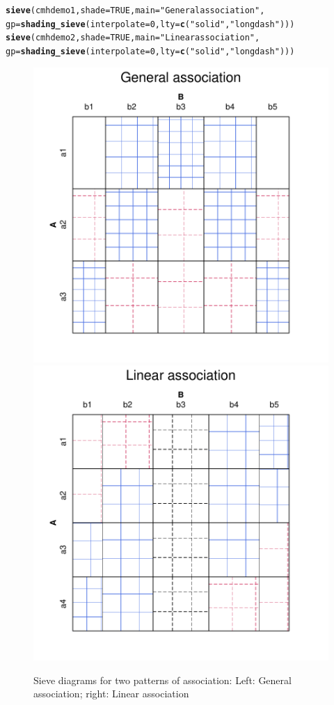 \documentclass[11pt]{book}\usepackage[]{graphicx}\usepackage[]{color}
\makeatletter
\newcommand{\hlnum}[1]{\textcolor[rgb]{0.686,0.059,0.569}{#1}}%
\newcommand{\hlstr}[1]{\textcolor[rgb]{0.192,0.494,0.8}{#1}}%
\newcommand{\hlstd}[1]{\textcolor[rgb]{0.345,0.345,0.345}{#1}}%
\newcommand{\hlkwc}[1]{\textcolor[rgb]{0.333,0.667,0.333}{#1}}%
\newcommand{\hlkwd}[1]{\textcolor[rgb]{0.737,0.353,0.396}{\textbf{#1}}}%
\newenvironment{kframe}{%
 \def\at@end@of@kframe{}%
 \ifinner\ifhmode%
  \def\at@end@of@kframe{\end{minipage}}%
  \begin{minipage}{\columnwidth}%
 \fi\fi%
 \def\FrameCommand##1{\hskip\@totalleftmargin \hskip-\fboxsep
 \colorbox{shadecolor}{##1}\hskip-\fboxsep
     \hskip-\linewidth \hskip-\@totalleftmargin \hskip\columnwidth}%
 \MakeFramed {\advance\hsize-\width
   \@totalleftmargin\z@ \linewidth\hsize
   \@setminipage}}%
 {\par\unskip\endMakeFramed%
 \at@end@of@kframe}
\newenvironment{knitrout}{}{} %
\renewenvironment{knitrout}{\small\renewcommand{\baselinestretch}{.85}}{} %
\makeatother
\begin{document}
\begin{knitrout}
\color{fgcolor}\begin{kframe}
\begin{alltt}
\hlkwd{sieve}\hlstd{(cmhdemo1,} \hlkwc{shade}\hlstd{=}\hlnum{TRUE}\hlstd{,} \hlkwc{main}\hlstd{=}\hlstr{"General association"}\hlstd{,}
  \hlkwc{gp} \hlstd{=} \hlkwd{shading_sieve}\hlstd{(}\hlkwc{interpolate} \hlstd{=} \hlnum{0}\hlstd{,} \hlkwc{lty} \hlstd{=} \hlkwd{c}\hlstd{(}\hlstr{"solid"}\hlstd{,} \hlstr{"longdash"}\hlstd{)))}
\hlkwd{sieve}\hlstd{(cmhdemo2,} \hlkwc{shade}\hlstd{=}\hlnum{TRUE}\hlstd{,} \hlkwc{main}\hlstd{=}\hlstr{"Linear association"}\hlstd{,}
  \hlkwc{gp} \hlstd{=} \hlkwd{shading_sieve}\hlstd{(}\hlkwc{interpolate} \hlstd{=} \hlnum{0}\hlstd{,} \hlkwc{lty} \hlstd{=} \hlkwd{c}\hlstd{(}\hlstr{"solid"}\hlstd{,} \hlstr{"longdash"}\hlstd{)))}
\end{alltt}
\end{kframe}\begin{figure}[htbp]


\centerline{\includegraphics[width=.49\textwidth]{ch04/fig/cmhdemo1} 
\includegraphics[width=.49\textwidth]{ch04/fig/cmhdemo2} }

\caption[Sieve diagrams for two patterns of association]{Sieve diagrams for two patterns of association: Left: General association; right: Linear association\label{fig:cmhdemo}}
\end{figure}


\end{knitrout}
\end{document}

